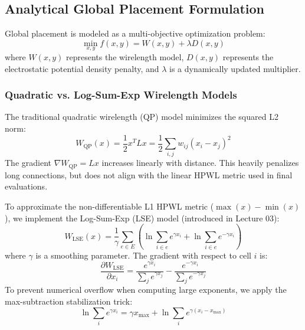 \documentclass[10pt, twocolumn]{article}
\begin{document}
\subsection{Analytical Global Placement Formulation}
Global placement is modeled as a multi-objective optimization problem:
\begin{equation}
\min_{x, y} f(x, y) = W(x, y) + \lambda D(x, y)
\end{equation}
where $W(x, y)$ represents the wirelength model, $D(x, y)$ represents the electrostatic potential density penalty, and $\lambda$ is a dynamically updated multiplier.

\subsubsection{Quadratic vs. Log-Sum-Exp Wirelength Models}
The traditional quadratic wirelength (QP) model minimizes the squared L2 norm:
\begin{equation}
W_{\text{QP}}(x) = \frac{1}{2} x^T L x = \frac{1}{2} \sum_{i,j} w_{ij} (x_i - x_j)^2
\end{equation}
The gradient $\nabla W_{\text{QP}} = L x$ increases linearly with distance. This heavily penalizes long connections, but does not align with the linear HPWL metric used in final evaluations. 

To approximate the non-differentiable L1 HPWL metric ($\max(x) - \min(x)$), we implement the Log-Sum-Exp (LSE) model (introduced in Lecture 03):
\begin{equation}
W_{\text{LSE}}(x) = \frac{1}{\gamma} \sum_{e \in E} \left( \ln \sum_{i \in e} e^{\gamma x_i} + \ln \sum_{i \in e} e^{-\gamma x_i} \right)
\end{equation}
where $\gamma$ is a smoothing parameter. The gradient with respect to cell $i$ is:
\begin{equation}
\frac{\partial W_{\text{LSE}}}{\partial x_i} = \frac{e^{\gamma x_i}}{\sum_{j} e^{\gamma x_j}} - \frac{e^{-\gamma x_i}}{\sum_{j} e^{-\gamma x_j}}
\end{equation}
To prevent numerical overflow when computing large exponents, we apply the max-subtraction stabilization trick:
\begin{equation}
\ln \sum_i e^{\gamma x_i} = \gamma x_{\max} + \ln \sum_i e^{\gamma(x_i - x_{\max})}
\end{equation}
\end{document}
